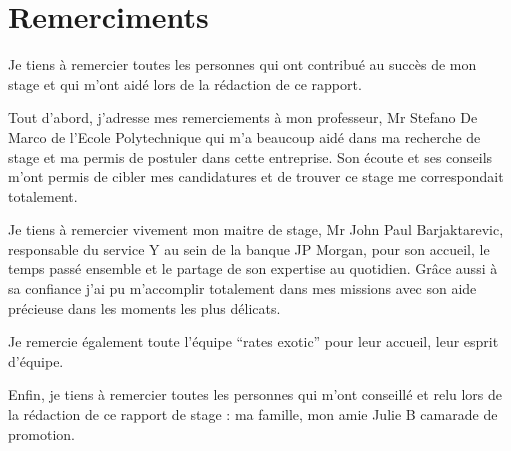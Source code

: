 

\chapter*{Remerciments}

Je tiens à remercier toutes les personnes qui ont contribué au succès de mon stage et qui m'ont aidé lors de la rédaction de ce rapport.

Tout d'abord, j'adresse mes remerciements à mon professeur, Mr Stefano De Marco de l'Ecole Polytechnique qui m'a beaucoup aidé dans ma recherche de stage et ma permis de postuler dans cette entreprise. Son écoute et ses conseils m'ont permis de cibler mes candidatures et de trouver ce stage me correspondait totalement.

Je tiens à remercier vivement mon maitre de stage, Mr John Paul Barjaktarevic, responsable du service Y au sein de la banque JP Morgan, pour son accueil, le temps passé ensemble et le partage de son expertise au quotidien. Grâce aussi à sa confiance j'ai pu m'accomplir totalement dans mes missions avec son aide précieuse dans les moments les plus délicats.

Je remercie également toute l'équipe ``rates exotic'' pour leur accueil, leur esprit d'équipe. 

Enfin, je tiens à remercier toutes les personnes qui m'ont conseillé et relu lors de la rédaction de ce rapport de stage : ma famille, mon amie Julie B camarade de promotion.


